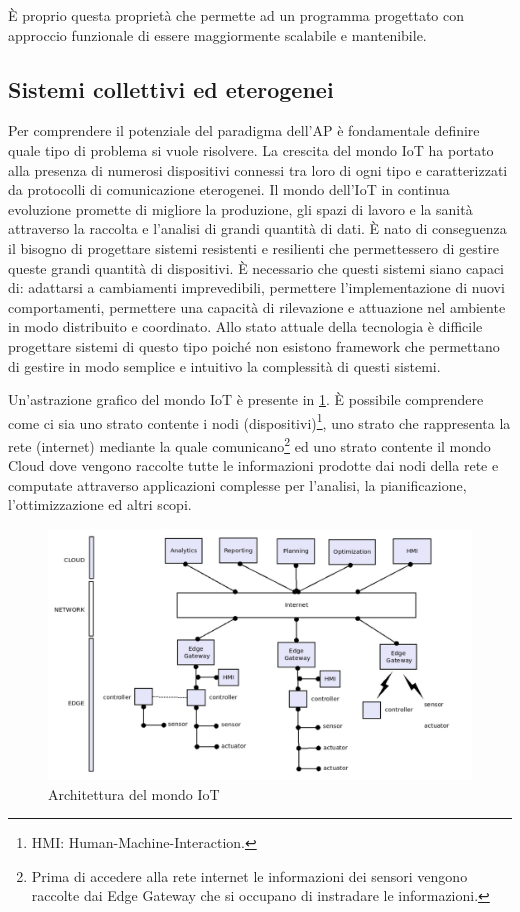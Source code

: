 \documentclass[12pt,a4paper,openright,twoside]{book}
\begin{document}
È proprio questa proprietà che permette ad un programma progettato con approccio funzionale di essere maggiormente scalabile e mantenibile.

\subsection{Sistemi collettivi ed eterogenei} 

Per comprendere il potenziale del paradigma dell'\ac{AP} è fondamentale definire quale tipo di problema si vuole risolvere. La crescita del mondo \ac{IoT} ha portato alla presenza di numerosi dispositivi connessi tra loro di ogni tipo e caratterizzati da protocolli di comunicazione eterogenei. Il mondo dell'IoT in continua evoluzione promette di migliore la produzione, gli spazi di lavoro e la sanità attraverso la raccolta e l'analisi di grandi quantità di dati. È nato di conseguenza il bisogno di progettare sistemi resistenti e resilienti che permettessero di gestire queste grandi quantità di dispositivi. È necessario che questi sistemi siano capaci di: adattarsi a cambiamenti imprevedibili, permettere l'implementazione di nuovi comportamenti, permettere una capacità di rilevazione e attuazione nel ambiente in modo distribuito e coordinato. Allo stato attuale della tecnologia è difficile progettare sistemi di questo tipo poiché non esistono framework che permettano di gestire in modo semplice e intuitivo la complessità di questi sistemi.

Un'astrazione grafico del mondo IoT è presente in \cref{fig:iot-arc}. È possibile comprendere come ci sia uno strato contente i nodi (dispositivi)\footnote{HMI: Human-Machine-Interaction.}, uno strato che rappresenta la rete (internet) mediante la quale comunicano\footnote{Prima di accedere alla rete internet le informazioni dei sensori vengono raccolte dai Edge Gateway che si occupano di instradare le informazioni.} ed uno strato contente il mondo Cloud dove vengono raccolte tutte le informazioni prodotte dai nodi della rete e computate attraverso applicazioni complesse per l'analisi, la pianificazione, l'ottimizzazione ed altri scopi.

\begin{figure}
    \centering
    \includegraphics[width=.8\linewidth]{figures/iot-arc.png}
    \caption{Architettura del mondo IoT}
    \label{fig:iot-arc}
\end{figure}
\end{document}

